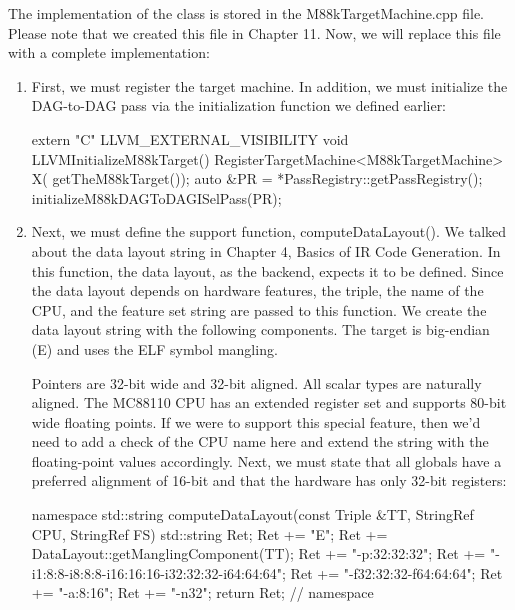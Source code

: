 
The implementation of the class is stored in the M88kTargetMachine.cpp file. Please note that we created this file in Chapter 11. Now, we will replace this file with a complete implementation:

\begin{enumerate}
\item
First, we must register the target machine. In addition, we must initialize the DAG-to-DAG pass via the initialization function we defined earlier:

\begin{cpp}
extern "C" LLVM_EXTERNAL_VISIBILITY void
LLVMInitializeM88kTarget() {
    RegisterTargetMachine<M88kTargetMachine> X(
        getTheM88kTarget());
    auto &PR = *PassRegistry::getPassRegistry();
    initializeM88kDAGToDAGISelPass(PR);
}
\end{cpp}

\item
Next, we must define the support function, computeDataLayout(). We talked about the data layout string in Chapter 4, Basics of IR Code Generation. In this function, the data layout, as the backend, expects it to be defined. Since the data layout depends on hardware features, the triple, the name of the CPU, and the feature set string are passed to this function. We create the data layout string with the following components. The target is big-endian (E) and uses the ELF symbol mangling.

Pointers are 32-bit wide and 32-bit aligned. All scalar types are naturally aligned. The MC88110 CPU has an extended register set and supports 80-bit wide floating points. If we were to support this special feature, then we’d need to add a check of the CPU name here and extend the string with the floating-point values accordingly. Next, we must state that all globals have a preferred alignment of 16-bit and that the hardware has only 32-bit registers:

\begin{cpp}
namespace {
std::string computeDataLayout(const Triple &TT,
                              StringRef CPU,
                              StringRef FS) {
    std::string Ret;
    Ret += "E";
    Ret += DataLayout::getManglingComponent(TT);
    Ret += "-p:32:32:32";
    Ret += "-i1:8:8-i8:8:8-i16:16:16-i32:32:32-i64:64:64";
    Ret += "-f32:32:32-f64:64:64";
    Ret += "-a:8:16";
    Ret += "-n32";
    return Ret;
}
} // namespace
\end{cpp}


\end{enumerate}
